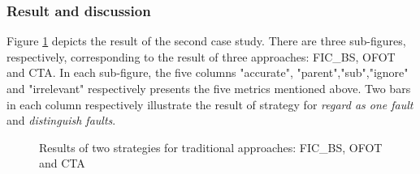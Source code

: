 \documentclass{sig-alternate}
\begin{document}
\subsubsection{Result and discussion}
Figure \ref{fig:normalexperiment} depicts the result of the second case study. There are three sub-figures, respectively, corresponding to the result of three approaches: FIC\_BS, OFOT and CTA. In each sub-figure, the five columns "accurate", "parent","sub","ignore" and "irrelevant" respectively presents the five metrics mentioned above. Two bars in each column respectively illustrate the result of strategy for \emph{regard as one fault} and \emph{distinguish faults}.

\begin{figure}[ht]
\centering
{}
\caption[]{Results of two strategies for traditional approaches: FIC\_BS, OFOT and CTA}
\label{fig:normalexperiment}
\end{figure}
\end{document}
